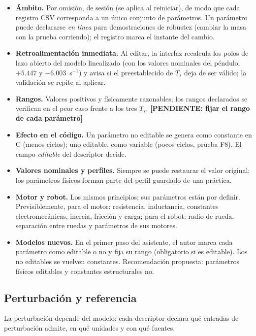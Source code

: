 \documentclass[12pt,letterpaper]{article}
\newcommand{\pendiente}[1]{\textbf{[PENDIENTE: #1]}}
\begin{document}
\begin{itemize}
    \item \textbf{Ámbito.} Por omisión, de sesión (se aplica al reiniciar), de modo que cada registro CSV corresponda a un único conjunto de parámetros. Un parámetro puede declararse \emph{en línea} para demostraciones de robustez (cambiar la masa con la prueba corriendo); el registro marca el instante del cambio.
    \item \textbf{Retroalimentación inmediata.} Al editar, la interfaz recalcula los polos de lazo abierto del modelo linealizado (con los valores nominales del péndulo, $+5.447$ y $-6.003$~s$^{-1}$) y avisa si el preestablecido de $T_s$ deja de ser válido; la validación se repite al aplicar.
    \item \textbf{Rangos.} Valores positivos y físicamente razonables; los rangos declarados se verifican en el peor caso frente a los tres $T_s$. \pendiente{fijar el rango de cada parámetro}
    \item \textbf{Efecto en el código.} Un parámetro no editable se genera como constante en C (menos ciclos); uno editable, como variable (pocos ciclos, prueba F8). El campo \emph{editable} del descriptor decide.
    \item \textbf{Valores nominales y perfiles.} Siempre se puede restaurar el valor original; los parámetros físicos forman parte del perfil guardado de una práctica.
    \item \textbf{Motor y robot.} Los mismos principios; sus parámetros están por definir. Previsiblemente, para el motor: resistencia, inductancia, constantes electromecánicas, inercia, fricción y carga; para el robot: radio de rueda, separación entre ruedas y parámetros de sus motores.
    \item \textbf{Modelos nuevos.} En el primer paso del asistente, el autor marca cada parámetro como editable o no y fija su rango (obligatorio si es editable). Los no editables se vuelven constantes. Recomendación propuesta: parámetros físicos editables y constantes estructurales no.
\end{itemize}

\subsection{Perturbación y referencia}

La perturbación depende del modelo: cada descriptor declara qué entradas de perturbación admite, en qué unidades y con qué fuentes.
\end{document}

